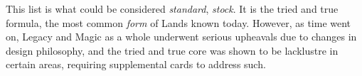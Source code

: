 \documentclass{report}
\begin{document}

This list is what could be considered \emph{standard}, \emph{stock}. It is the tried and true formula, the most common \emph{form} of Lands known today. 
However, as time went on, Legacy and Magic as a whole underwent serious upheavals due to changes in design philosophy, and the tried and true core was shown to be lacklustre in certain areas, requiring supplemental cards to address such. 
\newpage
\end{document}
